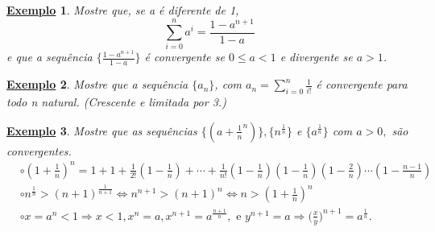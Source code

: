 \documentclass{article}
\newtheorem{example}{\underline{Exemplo}}
\begin{document}
\begin{example}
  Mostre que, se a \'e diferente de 1, 
  $$
    \sum\limits_{i=0}^{n}a^{i} = \frac{1-a^{n+1}}{1-a}
  $$
  e que a sequ\^encia $\biggl\{\frac{1-a^{n+1}}{1-a}\biggr\}$ \'e convergente se $0\leq{a}<1$ e divergente se $a > 1$.
\end{example}
\begin{example}
  Mostre que a sequ\^encia $\{a_{n}\}$, com $a_{n} = \displaystyle \sum\limits_{i=0}^{n}\frac{1}{i!}$ \'e convergente para todo n natural. (Crescente e limitada por 3.)
\end{example}
\begin{example}
  Mostre que as sequ\^encias $\biggl\{(a+\frac{1}{n}^{n})\biggr\}, \{n^{\frac{1}{n}}\}$ e $\{a^{\frac{1}{n}}\}$ com $a >0,$ s\~ao
convergentes.
 \begin{align*}
   &\circ (1+\frac{1}{n})^{n} = 1 + 1 + \frac{1}{2!}(1-\frac{1}{n}) + \cdots + \frac{1}{n!}(1-\frac{1}{n})(1-\frac{1}{n})(1-\frac{2}{n})\cdots(1-\frac{n-1}{n})\\
   &\circ n^{\frac{1}{n}} > (n+1)^{\frac{1}{n+1}}\Longleftrightarrow n^{n+1} > (n+1)^{n}\Longleftrightarrow n>(1+\frac{1}{n})^{n}\\
   &\circ x = a^{n} < 1\Rightarrow x < 1, x^{n} = a, x^{n+1} = a^{\frac{n+1}{n}},\text{ e } y^{n+1} = a \Rightarrow \biggl(\frac{x}{y}\biggr)^{n+1} = a^{\frac{1}{n}}.
 \end{align*}
\end{example}
\end{document}
